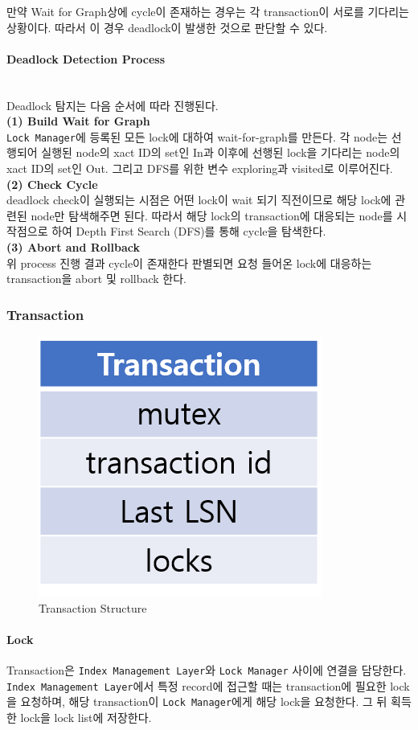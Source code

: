 \documentclass[main.tex]{subfiles}
\begin{document}
\noindent 만약 Wait for Graph상에 cycle이 존재하는 경우는 각 transaction이 서로를 기다리는 상황이다. 따라서 이 경우 deadlock이 발생한 것으로 판단할 수 있다.

\paragraph{Deadlock Detection Process}\mbox{}\\
Deadlock 탐지는 다음 순서에 따라 진행된다.\mbox{}\\

\noindent \textbf{(1) Build Wait for Graph}\\
\indent \texttt{Lock Manager}에 등록된 모든 lock에 대하여 wait-for-graph를 만든다. 각 node는 선행되어 실행된 node의 xact ID의 set인 In과 이후에 선행된 lock을 기다리는 node의 xact ID의 set인 Out. 그리고 DFS를 위한 변수 exploring과 visited로 이루어진다.
\mbox{}\\

\noindent \textbf{(2) Check Cycle}\\
\indent deadlock check이 실행되는 시점은 어떤 lock이 wait 되기 직전이므로 해당 lock에 관련된 node만 탐색해주면 된다. 따라서 해당 lock의 transaction에 대응되는 node를 시작점으로 하여 Depth First Search (DFS)를 통해 cycle을 탐색한다.
\mbox{}\\

\noindent \textbf{(3) Abort and Rollback}\\
\indent 위 process 진행 결과 cycle이 존재한다 판별되면 요청 들어온 lock에 대응하는 transaction을 abort 및 rollback 한다.
\mbox{}\\

\newpage
\subsubsection{Transaction}
\begin{figure}[!hbt]
	\centering
	\includegraphics[width=.3\textwidth]{images/cc/transaction.png}
	\caption{Transaction Structure}
\end{figure}

\paragraph{Lock}
Transaction은 \texttt{Index Management Layer}와 \texttt{Lock Manager} 사이에 연결을 담당한다.
\texttt{Index Management Layer}에서 특정 record에 접근할 때는 transaction에 필요한 lock을 요청하며,
해당 transaction이 \texttt{Lock Manager}에게 해당 lock을 요청한다. 그 뒤 획득한 lock을 lock list에 저장한다.
\end{document}
